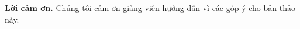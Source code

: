 \documentclass[runningheads]{llncs}
\begin{document}
%
\noindent\textbf{Lời cảm ơn.} Chúng tôi cảm ơn giảng viên hướng dẫn vì các góp
ý cho bản thảo này.
%
%
%
\clearpage
\end{document}
